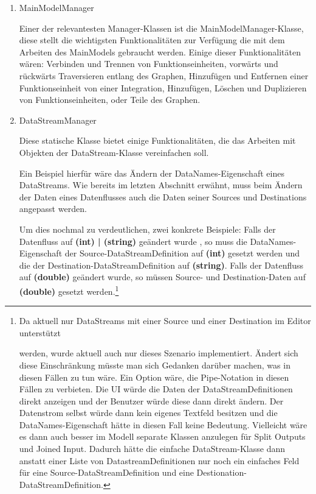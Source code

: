 \begin{enumerate}
	\item MainModelManager
	
	Einer der relevantesten Manager-Klassen ist die MainModelManager-Klasse,
	diese stellt die wichtigsten Funktionalitäten zur Verfügung die mit dem
	Arbeiten des MainModels gebraucht werden. Einige dieser Funktionalitäten
	wären: Verbinden und Trennen von Funktionseinheiten, vorwärts und rückwärts
	Traversieren entlang des Graphen, Hinzufügen und Entfernen einer
	Funktionseinheit von einer Integration, Hinzufügen, Löschen und Duplizieren
	von Funktionseinheiten, oder Teile des Graphen.
	
	\item DataStreamManager
	
	Diese statische Klasse bietet einige Funktionalitäten, die das Arbeiten mit
	Objekten der DataStream-Klasse vereinfachen soll.
	
	Ein Beispiel hierfür wäre das Ändern der DataNames-Eigenschaft eines DataStreams. 
	Wie bereits im letzten Abschnitt erwähnt, muss beim Ändern der Daten
	eines Datenflusses auch die Daten seiner Sources und Destinations
	angepasst werden. 
	
	Um dies nochmal zu verdeutlichen, zwei konkrete Beispiele:
	Falls der Datenfluss auf \textbf{(int) | (string) } geändert wurde
	, so muss die DataNames-Eigenschaft der Source-DataStreamDefinition auf
  \textbf{(int)} gesetzt werden und die der
	Destination-DataStreamDefinition auf \textbf{(string)}. 
	Falls der Datenfluss auf \textbf{(double)} geändert wurde, so müssen Source-
	und Destination-Daten auf  \textbf{(double)} gesetzt werden.\footnote{	Da aktuell nur DataStreams mit einer Source und einer Destination im Editor unterstützt
		
		werden, wurde aktuell auch nur dieses Szenario implementiert. Ändert sich
		diese Einschränkung müsste man sich Gedanken darüber machen, was in diesen
		Fällen zu tun wäre. Ein Option wäre, die Pipe-Notation in diesen Fällen zu
		verbieten. Die UI würde die Daten der DataStreamDefinitionen direkt
		anzeigen und der Benutzer würde diese dann direkt ändern. Der Datenstrom
		selbst würde dann kein eigenes Textfeld besitzen und die DataNames-Eigenschaft hätte in diesen Fall keine Bedeutung. 
		Vielleicht wäre es dann auch besser im Modell separate Klassen
		anzulegen für Split Outputs und Joined Input. Dadurch hätte die
		einfache DataStream-Klasse dann anstatt einer Liste von DatastreamDefinitionen nur noch ein einfaches Feld
		für eine Source-DataStreamDefinition und eine Destionation-DataStreamDefinition.}
	

\end{enumerate}
